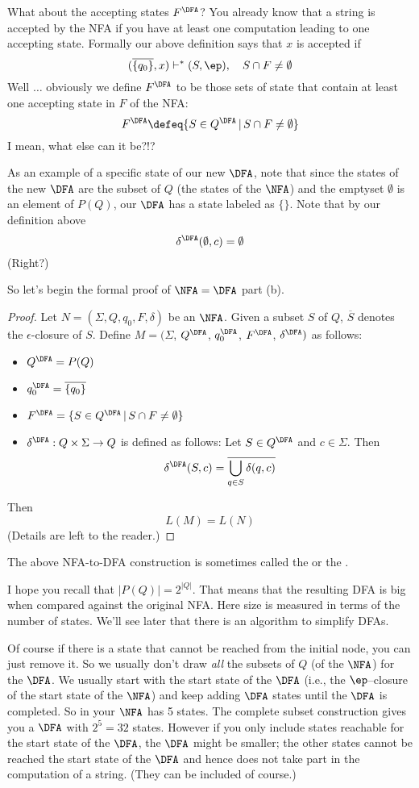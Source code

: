 What about the accepting states $F^{\DFA}$? You already know that a
string is accepted by the NFA if you have at least one computation
leading to one accepting state. Formally our above definition says
that $x$ is accepted if
\[
 (\overline{\{q_0\}}, x) \vdash^* (S, \ep), \quad S \cap F \neq \emptyset
\]
Well $\ldots$ obviously we define $F^{\DFA}$ to be those sets of
state that contain at least one accepting state in $F$ of the NFA:
\[
 F^{\DFA} \defeq \{S \in Q^{\DFA} \,|\, S \cap F \neq \emptyset \}
\]
I mean, what else can it be?!?

As an example of a specific state of our new $\DFA$,
note that since the states of the new $\DFA$ are the
subset of $Q$ (the states of the $\NFA$)
and the emptyset
$\emptyset$ is an element of $P(Q)$,
our $\DFA$ has a state labeled as $\{\}$.
Note that by our definition above
\[
\delta^{\DFA}(\emptyset, c)
= \emptyset
\]
(Right?)

So let's begin the formal proof of $\NFA=\DFA$ part (b).

\begin{proof}
Let $N = (\Sigma, Q, q_0, F, \delta)$ be an $\NFA$. 
Given a subset $S$ of $Q$, $\overline{S}$ denotes the $\epsilon$-closure
of $S$.
Define $M =
(\Sigma$, $Q^{\DFA}$, $q_0^{\DFA}$, $F^{\DFA}$, $\delta^{\DFA})$ as
follows: 
 \begin{itemize}
 \item $Q^{\DFA} = P(Q)$
 \item $q_0^{\DFA} = \overline{\{q_0\}}$
 \item $F^{\DFA} = \{ S \in Q^{\DFA} \,|\, S \cap F \neq \emptyset \}$
 \item $\delta^{\DFA} : Q \times \Sigma \rightarrow Q$ is defined as
 follows: Let $S \in Q^{\DFA}$ and $c \in \Sigma$. Then
 \[
   \delta^{\DFA}(S,c) = \overline{\bigcup_{q \in S} \delta(q,c)}
 \]
 \end{itemize}
Then 
\[
L(M) = L(N)
\]
(Details are left to the reader.)
\end{proof}

The above NFA-to-DFA construction is sometimes called the
 or the
\tinysidebarskip{}\sidebarskip{0pt}.


I hope you recall that $|P(Q)| = 2^{|Q|}$. 
That means that the
resulting DFA is big when compared against the original NFA. 
Here size is measured in terms of the
number of states. We'll see later that there is an algorithm to
simplify DFAs.

Of course if there is a state that cannot be reached from the initial
node, you can just remove it. 
So we usually don't draw \textit{all} the subsets of $Q$ (of the $\NFA$)
for the $\DFA$. 
We usually start with the start state of the $\DFA$ 
(i.e., the $\ep$--closure of the start state of the $\NFA$)
and keep adding $\DFA$ states until the $\DFA$ is completed.
So in your $\NFA$ has 5 states.
The complete subset construction gives you a $\DFA$ with $2^5 = 32$ states.
However if you only include states reachable for the start state
of the $\DFA$, the $\DFA$ might be smaller;
the other states cannot be reached the start state of the $\DFA$
and hence does not take part in the computation of a string.
(They can be included of course.)


